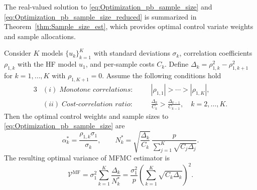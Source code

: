 The real-valued solution to \eqref{eq:Optimization_pb_sample_size} and \eqref{eq:Optimization_pb_sample_size_reduced} is summarized in Theorem~\ref{thm:Sample_size_est}, which provides optimal control variate weights and sample allocations.

\begin{theorem}\label{thm:Sample_size_est}
Consider $K$ models $\{u_{k}\}_{k=1}^K$ with standard deviations $\sigma_k$, correlation coefficients $\rho_{1,k}$ with the HF model $u_1$, and per-sample costs $C_k$. Define $\Delta_k = \rho_{1,k}^2 - \rho_{1,k+1}^2$ for $k = 1, \dots, K$ with $\rho_{1,K+1}=0$. Assume the following conditions hold
%
\begin{alignat*}{3}
&(i)\;\textit{Monotone correlations:} &\quad& |\rho_{1,1}| > \cdots > |\rho_{1,K}|,\\
&(ii)\;\textit{Cost-correlation ratio:} &\quad& \frac{\Delta_{k}}{C_k} > \frac{\Delta_{k-1}}{C_{k-1}}, \quad k=2,\ldots,K.
\end{alignat*}
%
Then the optimal control weights and sample sizes to \eqref{eq:Optimization_pb_sample_size} are
%
\begin{equation}\label{eq:MFMC_RealValued_Sample_Size}
    \alpha_k^* = \frac{\rho_{1,k}\sigma_1}{\sigma_k}, \qquad
    N_k^* = \sqrt{\frac{\Delta_k}{C_k}}\,
    \frac{p}{\sum_{j=1}^K \sqrt{C_j \Delta_j}}.
\end{equation}
%
%
The resulting optimal variance of MFMC estimator is
\begin{equation}\label{eq:MFMC_variance_optimal}
\mathcal{V}^{\text{MF}}
= \sigma_1^2\sum_{k=1}^K \frac{\Delta_k}{N_k^*}=\frac{\sigma_1^2}{p}\!\left(\sum_{k=1}^K \sqrt{C_k \Delta_k}\right)^{\!2}.
\end{equation}
\end{theorem}


